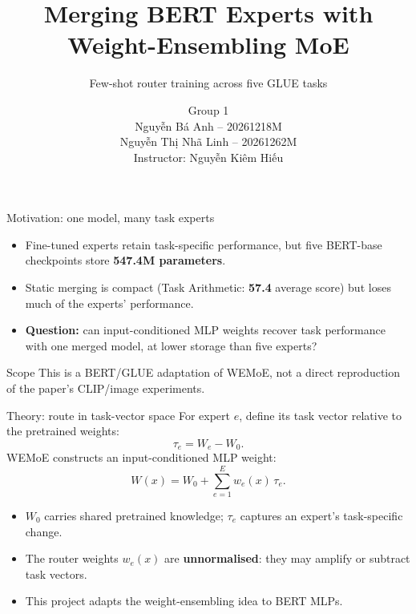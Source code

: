 \documentclass[aspectratio=169,10pt]{beamer}
\title[WEMoE for NLP]{Merging BERT Experts with Weight-Ensembling MoE}
\subtitle{Few-shot router training across five GLUE tasks}
\author[Group 1]{Group 1\texorpdfstring{\\[2pt]}{ }{\small Nguyễn Bá Anh -- 20261218M\\ Nguyễn Thị Nhã Linh -- 20261262M}\texorpdfstring{\\[2pt]}{ }{\small\textcolor{blue!55!black}{Instructor: Nguyễn Kiêm Hiếu}}}
\institute{}
\date{}
\begin{document}
\begin{frame}[plain]
  \titlepage
\end{frame}

\begin{frame}{Motivation: one model, many task experts}
  \begin{itemize}
    \item Fine-tuned experts retain task-specific performance, but five BERT-base checkpoints store \textbf{547.4M parameters}.
    \item Static merging is compact (Task Arithmetic: \textbf{57.4} average score) but loses much of the experts' performance.
    \item \textbf{Question:} can input-conditioned MLP weights recover task performance with one merged model, at lower storage than five experts?
  \end{itemize}
  \vfill
  \begin{block}{Scope}
    This is a BERT/GLUE adaptation of WEMoE, not a direct reproduction of the paper's CLIP/image experiments.\cite{tang2024wemoe}
  \end{block}
\end{frame}

\begin{frame}{Theory: route in task-vector space}
  For expert $e$, define its task vector relative to the pretrained weights:
  \[
    \tau_e = W_e - W_0.
  \]
  WEMoE constructs an input-conditioned MLP weight:
  \[
    W(x) = W_0 + \sum_{e=1}^{E} w_e(x)\,\tau_e.
  \]
  \begin{itemize}
    \item $W_0$ carries shared pretrained knowledge; $\tau_e$ captures an expert's task-specific change.
    \item The router weights $w_e(x)$ are \textbf{unnormalised}: they may amplify or subtract task vectors.
    \item This project adapts the weight-ensembling idea to BERT MLPs.\cite{tang2024wemoe}
  \end{itemize}
\end{frame}
\end{document}
